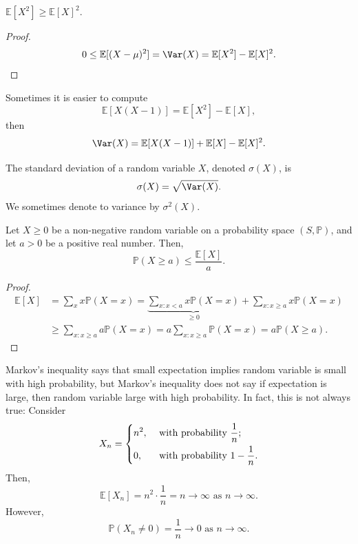 \begin{corollary}
    \(\mathbb{E} [X^2] \ge \mathbb{E} [X]^2\). 
\end{corollary}
\begin{proof}
    \[
        0 \le \mathbb{E} [(X - \mu )^2] = \Var(X) = \mathbb{E} [X^2] - \mathbb{E} [X]^2.
    \]
\end{proof}

\begin{remark}
    Sometimes it is easier to compute 
    \[
        \mathbb{E} [X(X - 1)] = \mathbb{E} [X^2] - \mathbb{E} [X],
    \]
    then 
    \[
        \Var(X) = \mathbb{E} [X(X-1)] + \mathbb{E} [X] - \mathbb{E} [X]^2.
    \]
\end{remark}

\begin{definition}
    The standard deviation of a random variable \(X\), denoted \(\sigma (X)\), is 
    \[
        \sigma (X) = \sqrt{\Var(X)}. 
    \]  
    We sometimes denote to variance by \(\sigma ^2(X)\). 
\end{definition}

\begin{proposition}
    Let \(X \ge 0\) be a non-negative random variable on a probability space \((S, \mathbb{P} )\), and let \(a > 0\) be a positive real number. Then, 
    \[
        \mathbb{P} (X \ge a) \le \frac{\mathbb{E} [X]}{a}.
    \]   
\end{proposition}

\begin{proof}
    \begin{align*}
        \mathbb{E} [X] &= \sum_{x} x \mathbb{P} (X = x) = \underbrace{\sum_{x: x < a} x\mathbb{P} (X = x)}_{\ge 0} + \sum_{x : x \ge a} x \mathbb{P} (X = x) \\
        &\ge \sum_{x: x \ge a} a \mathbb{P} (X = x) = a \sum_{x: x \ge a} \mathbb{P} (X = x)  = a \mathbb{P} (X \ge a).    
    \end{align*}
\end{proof}

\begin{remark}
    Markov's inequality says that small expectation implies random variable is small with high probability, but Markov's inequality does not say if expectation is large, then  random variable large with high probability. In fact, this is not always true: Consider 
    \[
        X_n = \begin{dcases}
            n^2, &\text{ with probability } \frac{1}{n} ;\\
            0, &\text{ with probability } 1 - \frac{1}{n} .
        \end{dcases}
    \]
    Then,
    \[
        \mathbb{E} [X_n] = n^2 \cdot \frac{1}{n} = n \to \infty \text{ as } n \to \infty. 
    \]
    However, 
    \[
        \mathbb{P} (X_n \neq 0) = \frac{1}{n} \to 0 \text{ as } n \to \infty. 
    \]
\end{remark}

